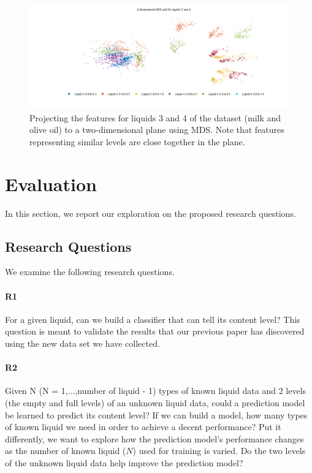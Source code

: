 \documentclass{article} %
\begin{document}
\begin{figure}[htb]
\centering
\includegraphics[width=0.8\linewidth]{mds_3_4.png}
\caption{Projecting the features for liquids 3 and 4 of the dataset (milk and olive oil) to a two-dimensional plane using MDS. Note that features representing similar levels are close together in the plane.}
\label{fig:mds}
\end{figure}

\section{Evaluation}
In this section, we report our exploration on the proposed research questions.

\subsection{Research Questions}
We examine the following research questions.

\paragraph{R1} For a given liquid, can we build a classifier that can tell its content level? This question is meant to validate the results that our previous paper has discovered using the new data set we have collected.

\paragraph{R2} Given N (N = 1,...,number of liquid - 1) types of known liquid data and 2 levels (the empty and full levels) of an unknown liquid data, could a prediction model be learned to predict its content level? If we can build a model, how many types of known liquid we need in order to achieve a decent performance? Put it differently, we want to explore how the prediction model's performance changes as the number of known liquid ($N$) used for training is varied. Do the two levels of the unknown liquid data help improve the prediction model? 
\end{document}
